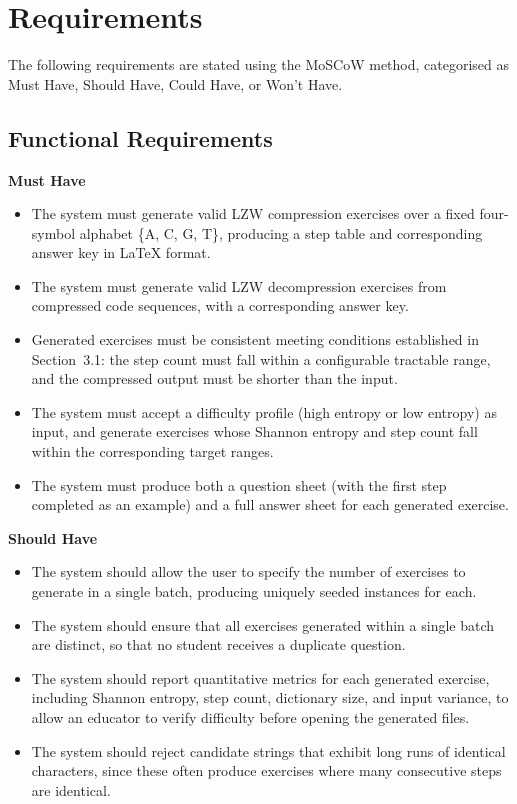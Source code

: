 \documentclass{l4proj}
\begin{document}
\section{Requirements}

The following requirements are stated using the MoSCoW method, categorised as Must Have, Should Have, Could Have, or Won't Have.

\subsection{Functional Requirements}

\textbf{Must Have}

\begin{itemize}
    \item The system must generate valid LZW compression exercises over a fixed four-symbol alphabet \{A, C, G, T\}, producing a step table and corresponding answer key in LaTeX format.

    \item The system must generate valid LZW decompression exercises from compressed code sequences, with a corresponding answer key.

    \item Generated exercises must be consistent meeting conditions established in Section~3.1: the step count must fall within a configurable tractable range, and the compressed output must be shorter than the input.

    \item The system must accept a difficulty profile (high entropy or low entropy) as input, and generate exercises whose Shannon entropy and step count fall within the corresponding target ranges.

    \item The system must produce both a question sheet (with the first step completed as an example) and a full answer sheet for each generated exercise.
\end{itemize}

\textbf{Should Have}

\begin{itemize}
    \item The system should allow the user to specify the number of exercises to generate in a single batch, producing uniquely seeded instances for each.

    \item The system should ensure that all exercises generated within a single batch are distinct, so that no student receives a duplicate question.

    \item The system should report quantitative metrics for each generated exercise, including Shannon entropy, step count, dictionary size, and input variance, to allow an educator to verify difficulty before opening the generated files.

    \item The system should reject candidate strings that exhibit long runs of identical characters, since these often produce exercises where many consecutive steps are identical.
\end{itemize}
\end{document}
